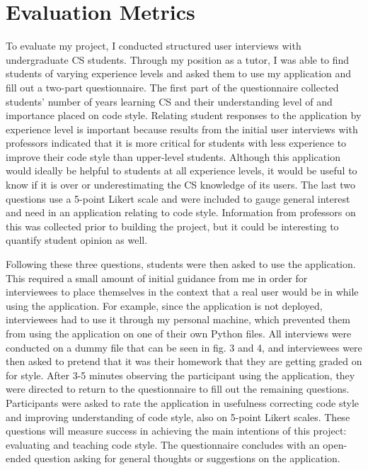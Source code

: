 \documentclass[10pt,twocolumn]{article}
\begin{document}
\section{Evaluation Metrics}
To evaluate my project, I conducted structured user interviews with undergraduate CS students. 
Through my position as a tutor, I was able to find students of varying experience levels and asked them to use my application and fill out a two-part questionnaire. 
The first part of the questionnaire collected students' number of years learning CS and their understanding level of and importance placed on code style. 
Relating student responses to the application by experience level is important because results from the initial user interviews with professors indicated that it is more critical for students with less experience to improve their code style than upper-level students. 
Although this application would ideally be helpful to students at all experience levels, it would be useful to know if it is over or underestimating the CS knowledge of its users. 
The last two questions use a 5-point Likert scale and were included to gauge general interest and need in an application relating to code style. 
Information from professors on this was collected prior to building the project, but it could be interesting to quantify student opinion as well. 

Following these three questions, students were then asked to use the application. 
This required a small amount of initial guidance from me in order for interviewees to place themselves in the context that a real user would be in while using the application.
For example, since the application is not deployed, interviewees had to use it through my personal machine, which prevented them from using the application on one of their own Python files. 
All interviews were conducted on a dummy file that can be seen in fig. 3 and 4, and interviewees were then asked to pretend that it was their homework that they are getting graded on for style.
After 3-5 minutes observing the participant using the application, they were directed to return to the questionnaire to fill out the remaining questions. 
Participants were asked to rate the application in usefulness correcting code style and improving understanding of code style, also on 5-point Likert scales. 
These questions will measure success in achieving the main intentions of this project: evaluating and teaching code style. 
The questionnaire concludes with an open-ended question asking for general thoughts or suggestions on the application. 
\end{document}
